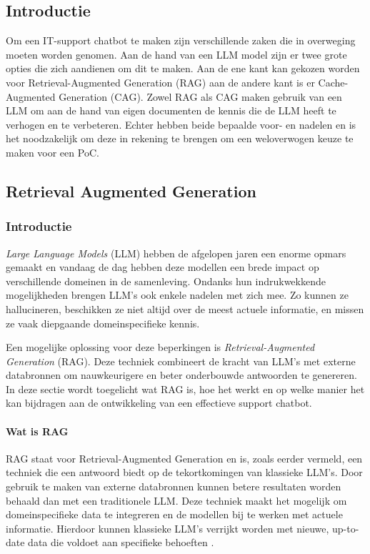     \subsection{Introductie}
    
    Om een IT-support chatbot te maken zijn verschillende zaken die in overweging moeten worden genomen. Aan de hand van een LLM model zijn er twee grote opties die zich aandienen om dit te maken. Aan de ene kant kan gekozen worden voor Retrieval-Augmented Generation (RAG) aan de andere kant is er Cache-Augmented Generation (CAG). Zowel RAG als CAG maken gebruik van een LLM om aan de hand van eigen documenten de kennis die de LLM heeft te verhogen en te verbeteren. Echter hebben beide bepaalde voor- en nadelen en is het noodzakelijk om deze in rekening te brengen om een weloverwogen keuze te maken voor een PoC. 
    
    \subsection{Retrieval Augmented Generation}
    \subsubsection{Introductie}   
    \textit{Large Language Models} (LLM) hebben de afgelopen jaren een enorme opmars gemaakt en vandaag de dag hebben deze modellen een brede impact op verschillende domeinen in de samenleving. Ondanks hun indrukwekkende mogelijkheden brengen LLM’s ook enkele nadelen met zich mee. Zo kunnen ze hallucineren, beschikken ze niet altijd over de meest actuele informatie, en missen ze vaak diepgaande domeinspecifieke kennis.  
    
    Een mogelijke oplossing voor deze beperkingen is \textit{Retrieval-Augmented Generation} (RAG). Deze techniek combineert de kracht van LLM’s met externe databronnen om nauwkeurigere en beter onderbouwde antwoorden te genereren. In deze sectie wordt toegelicht wat RAG is, hoe het werkt en op welke manier het kan bijdragen aan de ontwikkeling van een effectieve support chatbot.
    
    \paragraph{Wat is RAG}
    RAG staat voor Retrieval-Augmented Generation en is, zoals eerder vermeld, een techniek die een antwoord biedt op de tekortkomingen van klassieke LLM’s. Door gebruik te maken van externe databronnen kunnen betere resultaten worden behaald dan met een traditionele LLM. Deze techniek maakt het mogelijk om domeinspecifieke data te integreren en de modellen bij te werken met actuele informatie. Hierdoor kunnen klassieke LLM’s verrijkt worden met nieuwe, up-to-date data die voldoet aan specifieke behoeften \autocite{Wu2024}.
    
